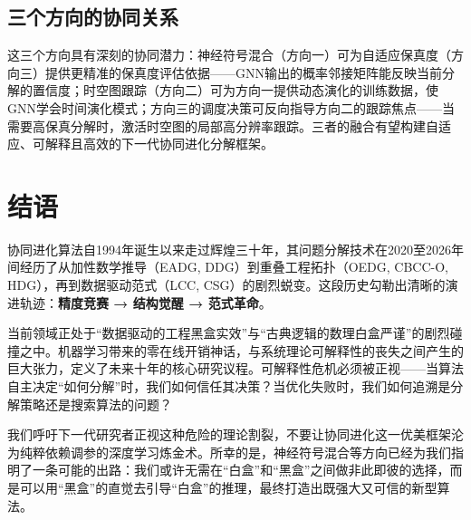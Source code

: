 \subsection{三个方向的协同关系}
这三个方向具有深刻的协同潜力：神经符号混合（方向一）可为自适应保真度（方向三）提供更精准的保真度评估依据——GNN输出的概率邻接矩阵能反映当前分解的置信度；时空图跟踪（方向二）可为方向一提供动态演化的训练数据，使GNN学会时间演化模式；方向三的调度决策可反向指导方向二的跟踪焦点——当需要高保真分解时，激活时空图的局部高分辨率跟踪。三者的融合有望构建自适应、可解释且高效的下一代协同进化分解框架。

\section{结语}

协同进化算法自1994年诞生以来走过辉煌三十年，其问题分解技术在2020至2026年间经历了从加性数学推导（EADG, DDG）到重叠工程拓扑（OEDG, CBCC-O, HDG），再到数据驱动范式（LCC, CSG）的剧烈蜕变。这段历史勾勒出清晰的演进轨迹：\textbf{精度竞赛 → 结构觉醒 → 范式革命}。

当前领域正处于“数据驱动的工程黑盒实效”与“古典逻辑的数理白盒严谨”的剧烈碰撞之中。机器学习带来的零在线开销神话，与系统理论可解释性的丧失之间产生的巨大张力，定义了未来十年的核心研究议程。可解释性危机必须被正视——当算法自主决定“如何分解”时，我们如何信任其决策？当优化失败时，我们如何追溯是分解策略还是搜索算法的问题？

我们呼吁下一代研究者正视这种危险的理论割裂，不要让协同进化这一优美框架沦为纯粹依赖调参的深度学习炼金术。所幸的是，神经符号混合等方向已经为我们指明了一条可能的出路：我们或许无需在“白盒”和“黑盒”之间做非此即彼的选择，而是可以用“黑盒”的直觉去引导“白盒”的推理，最终打造出既强大又可信的新型算法。

